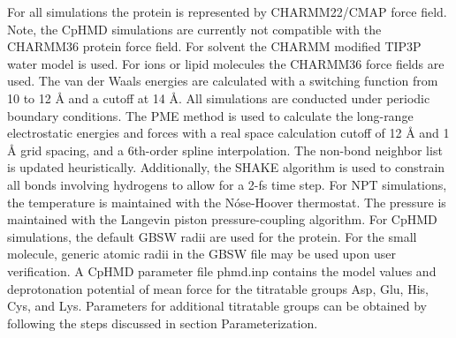 For all simulations the protein 
is represented by CHARMM22/CMAP force field.\cite{MacKerell_Karplus_1998_J.Phys.Chem.B,MacKerell_Brooks_2004_J.Am.Chem.Soc.}
Note, the CpHMD simulations are currently not compatible with the CHARMM36 protein force field.
For solvent the CHARMM modified TIP3P water model is used.
For ions or lipid molecules the CHARMM36 force fields are used.\cite{Klauda_Pastor_2010_J.Phys.Chem.B}
The van der Waals energies are calculated with a switching function from 10 to 12 {\AA} and  a cutoff at 14 {\AA}. 
All simulations are conducted under periodic boundary conditions. 
The PME method\cite{Darden_Pedersen_1993_J.Chem.Phys.} is used to calculate the long-range electrostatic energies and forces with a real space calculation cutoff of 12 {\AA} and 1 {\AA} grid spacing, and a 6th-order spline interpolation. 
The non-bond neighbor list is updated heuristically. 
Additionally, the SHAKE\cite{Ryckaert_Berendsen_1977_J.Comput.Phys.} algorithm is used to constrain all bonds involving hydrogens to allow for a 2-fs time step. 
For NPT simulations, the temperature is maintained with the N\'{o}se-Hoover thermostat.\cite{Nose_Nose_1984_Mol.Phys.,Hoover_Hoover_1985_Phys.Rev.Aa}
The pressure is maintained with the Langevin piston pressure-coupling algorithm.\cite{Feller_Brooks_1995_J.Chem.Phys.}
For CpHMD simulations, the default GBSW radii \cite{Nina_Roux_1997_J.Phys.Chem.B,Chen_Brooks_2006_J.Am.Chem.Soc.} are used for the protein.
For the small molecule, generic atomic radii in the GBSW file may be used upon user verification. 
A CpHMD parameter file phmd.inp contains
the model {\pka} values and deprotonation potential of mean force for the titratable groups Asp, Glu, His, Cys, and Lys. 
Parameters for additional titratable groups
can be obtained by following the steps discussed in section Parameterization.
